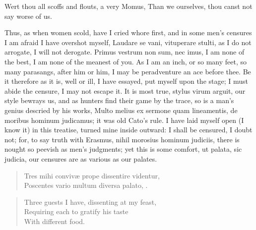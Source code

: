 {Wert thou all scoffs and flouts, a very Momus,
Than we ourselves, thou canst not say worse of us.

Thus, as when women scold, have I cried whore first, and in some men's
censures I am afraid I have overshot myself, Laudare se vani,
vituperare stulti, as I do not arrogate, I will not derogate. Primus
vestrum non sum, nec imus, I am none of the best, I am none of the
meanest of you. As I am an inch, or so many feet, so many parasangs,
after him or him, I may be peradventure an ace before thee. Be it
therefore as it is, well or ill, I have essayed, put myself upon the
stage; I must abide the censure, I may not escape it. It is most true,
stylus virum arguit, our style bewrays us, and as hunters find
their game by the trace, so is a man's genius descried by his works,
Multo melius ex sermone quam lineamentis, de moribus hominum judicamus;
it was old Cato's rule. I have laid myself open (I know it) in this
treatise, turned mine inside outward: I shall be censured, I doubt not;
for, to say truth with Erasmus, nihil morosius hominum judiciis, there
is nought so peevish as men's judgments; yet this is some comfort, ut
palata, sic judicia, our censures are as various as our palates.

\begin{verse}
\textlatin{Tres mihi conviv\ae{} prope dissentire videntur},\\
\textlatin{Poscentes vario multum diversa palato, \etc.}
\end{verse}

\begin{verse}
Three guests I have, dissenting at my feast,\\
Requiring each to gratify his taste\\
With different food.
\end{verse}

}
